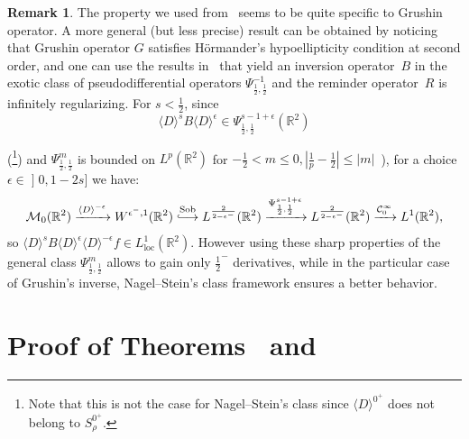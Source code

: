 \documentclass[10pt]{amsart}
\theoremstyle{definition}\newtheorem{defi}[theo]{Definition}\newtheorem{rema}[theo]{Remark}\newtheorem{exam}[theo]{Example}\newtheorem{exem}[theo]{Example}\newtheorem{nota}[theo]{Notation}
\DeclareMathOperator{\Sob}{Sob}
\DeclareMathOperator{\locc}{loc}
\newcommand{\bbR}{\mathbb{R}}
\newcommand{\clC}{\mathcal{C}}
\newcommand{\clM}{\mathcal{M}}
\newcommand{\longhookrightarrow}{\lhook\joinrel\longrightarrow}
\newcommand*{\hookto}{\mathchoice{\longhookrightarrow}{\hookrightarrow}{\hookrightarrow}{\hookrightarrow}}
\newcommand*{\MK}{\mkern 2mu}
\begin{document}
\begin{rema}
The property we used from~\cite{NS} seems to be quite specific to Grushin operator. A more general (but less precise) result can be obtained by noticing that Grushin operator $G$ satisfies H\"ormander's hypoellipticity condition at second order, and one can use the results in~\cite{CCX} that yield an inversion operator~$B$ in the exotic class of pseudodifferential operators $\Psi^{-1}_{\frac 12,\frac 12}$ and the reminder operator~$R$ is infinitely regularizing.
For $s<\frac 12$, since
\[
\langle D\rangle^{s}B\langle D\rangle^\epsilon \in \Psi^{s-1+\epsilon}_{\frac 12,\frac 12}(\bbR^2)
\]

\noindent (\cite[Theorem~8.4$\MK$(3) combined with the remark at the end of ibid. in \S~VIII]{Ho}\footnote{Note that this is not the case for Nagel--Stein's class since $\langle D\rangle ^{0^+}$ does not belong to $S^{0^+}_\rho$.})
and $\Psi^m_{\frac 12,\frac 12}$ is bounded on $L^p(\bbR^2)$ for $-\frac 12<m\leq 0, |\frac 1p-\frac 12|\leq |m|$~\cite[\S~VIII, 5.12$\MK$(e), (g)]{Stein}), for a choice $\epsilon\in\mathopen{]}0,1-2s]$ we have:
\[
\clM_0(\bbR^2) \xrightarrow{\langle D\rangle^{-\epsilon} } W^{\epsilon^-,1} (\bbR^2)\overset{\Sob}{\hookto}L^{\frac{2}{2-\epsilon^-}}(\bbR^2)\xrightarrow{\Psi^{s-1+\epsilon}_{\frac 12,\frac 12}}L^{\frac{2}{2-\epsilon^-}}(\bbR^2) \xrightarrow{\clC^\infty_0} L^1(\bbR^2),
\]
so $ \langle D\rangle^{s} B\langle D\rangle^\epsilon \langle D\rangle ^{-\epsilon} f\in L^1_{\locc}(\bbR^2)$. However using these sharp properties of the general class $\Psi^m_{\frac 12,\frac 12}$ allows to gain only $\frac{1}{2}^-$ derivatives, while in the particular case of Grushin's inverse, Nagel--Stein's class framework ensures a better behavior.
\end{rema}



\section{Proof of Theorems~\protect{\ref{thvectcinfty}} and \protect{\ref{thvectL1}}}\label{secthyposyst}
\end{document}
